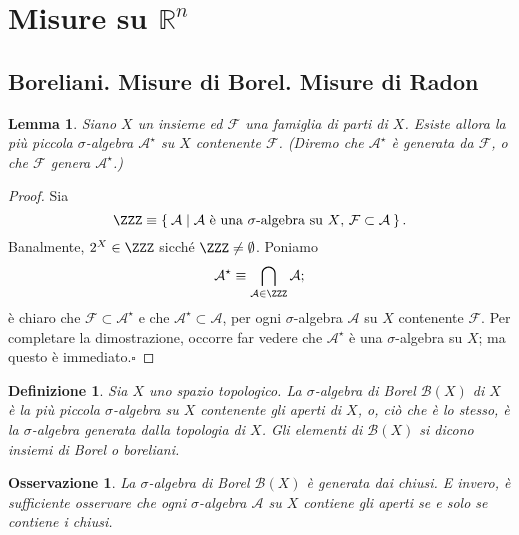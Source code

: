 \documentclass[a4paper,10pt,openright,oneside]{book}
\theoremstyle{theoremstyle}
\newtheorem{lemma}[teorema]{Lemma}
\theoremstyle{theoremstylewoheader}
\theoremstyle{theoremstyle}
\newtheorem{definizione}[teorema]{Definizione}
\newtheorem{osservazione}[teorema]{Osservazione}
\theoremstyle{proofsecstyle}
\theoremstyle{nonumberplain}
\newtheorem{proof}{Dim.}
\renewcommand{\AA}{\ensuremath{\mathcal{A}}}
\newcommand{\BB}{\ensuremath{\mathcal{B}}}
\newcommand{\FF}{\ensuremath{\mathcal{F}}}
\newcommand{\RR}{\ensuremath{\mathbb{R}}}
\renewcommand{\qedsymbol}{\ensuremath{\square}}
\newcommand{\qed}{\unskip\nobreak\hfill\nobreak\hspace{.5em}\qedsymbol}
\begin{document}
\section{Misure su $\RR^n$}

\subsection{Boreliani. Misure di Borel. Misure di Radon}

\begin{lemma}
\label{pro:sigma_algebra_generata}
Siano $X$ un insieme ed $\FF$ una famiglia di parti di $X$. Esiste allora la più piccola $\sigma$-algebra $\AA^\star$ su $X$ contenente $\FF$. (Diremo che $\AA^\star$ è \emph{generata} da $\FF$, o che $\FF$ \emph{genera} $\AA^\star$.)
\end{lemma}

\begin{proof}
Sia
\[
\ZZZ \equiv \Set{ \AA | \text{$\AA$ è una $\sigma$-algebra su $X$, $\FF \subset \AA$} }.
\]
Banalmente, $2^X \in \ZZZ$ sicché $\ZZZ \ne \emptyset$. Poniamo
\[
\AA^\star \equiv \bigcap_{\AA \in \ZZZ} \AA;
\]
è chiaro che $\FF \subset \AA^\star$ e che $\AA^\star \subset \AA$, per ogni $\sigma$-algebra $\AA$ su $X$ contenente $\FF$. Per completare la dimostrazione, occorre far vedere che $\AA^\star$ è una $\sigma$-algebra su $X$; ma questo è immediato.\qed
\end{proof}
 
\begin{definizione}
\label{def:sigma_algebra_borel}
Sia $X$ uno spazio topologico. La \emph{$\sigma$-algebra di Borel} $\BB(X)$ di $X$ è la più piccola $\sigma$-algebra su $X$ contenente gli aperti di $X$, o, ciò che è lo stesso, è la $\sigma$-algebra generata dalla topologia di $X$. Gli elementi di $\BB(X)$ si dicono \emph{insiemi di Borel} o \emph{boreliani}.
\end{definizione}

\begin{osservazione}
\label{oss:sigma_algebra_borel_est_generata_dai_chiusi}
La $\sigma$-algebra di Borel $\BB(X)$ è generata dai chiusi. E invero, è sufficiente osservare che ogni $\sigma$-algebra $\AA$ su $X$ contiene gli aperti se e solo se contiene i chiusi.
\end{osservazione}
\end{document}
